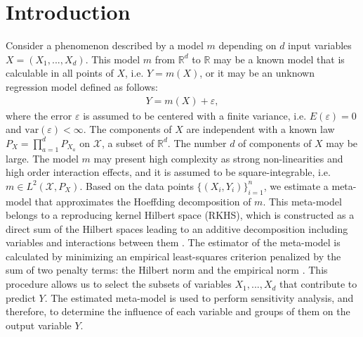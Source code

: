 \section{Introduction}
Consider a phenomenon described by a model $m$ depending on $d$ input variables $X=(X_1,...,X_d)$. This model $m$ from $\mathbb{R}^d$ to $\mathbb{R}$ may be a known model that is calculable in all points of $X$, i.e. $Y=m(X)$, or it may be an unknown regression model defined as follows:
\begin{align}
\label{grm}
Y=m(X)+\varepsilon,
\end{align}
where the error $\varepsilon$ is assumed to be centered with a finite variance, i.e. $E(\varepsilon)=0$ and $\mbox{var}(\varepsilon)<\infty$.  
The components of $X$ are independent with a known law $P_X=\prod_{a=1}^dP_{X_a}$ on $\mathcal{X}$, a subset of $\mathbb{R}^d$. The number $d$ of components of $X$ may be large. The model $m$ may present high complexity as strong non-linearities and high order interaction effects, and it is assumed to be square-integrable, i.e. $m\in L^2(\mathcal{X},P_X)$.   
Based on the data points $\{(X_i,Y_i)\}_{i=1}^n$, we estimate a meta-model that approximates the Hoeffding decomposition of $m$. This meta-model belongs to a reproducing kernel Hilbert space (RKHS), which is constructed as a direct sum of the Hilbert spaces leading to an additive decomposition including variables and interactions between them \citep{DURRANDE201357}. 
The estimator of the meta-model is calculated by minimizing an empirical least-squares criterion penalized by the sum of two penalty terms: the Hilbert norm and the empirical norm \citep{huet:hal-01434895}. This procedure allows us to select the subsets of variables $X_1,...,X_d$ that contribute to predict $Y$. The estimated meta-model is used to perform sensitivity analysis, and therefore, to determine the influence of each variable and groups of them on the output variable $Y$.  

